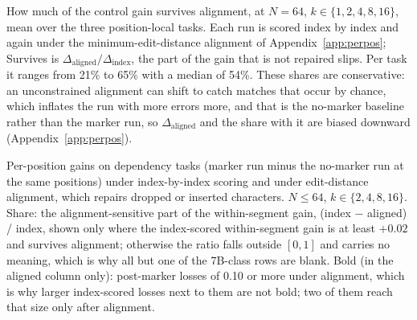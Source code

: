 \documentclass[10pt]{article} %
\begin{document}
\begin{table}[!htbp]
\centering
\small
\caption{How much of the control gain survives alignment, at $N = 64$, $k \in \{1, 2, 4, 8, 16\}$, mean over the three position-local tasks. Each run is scored index by index and again under the minimum-edit-distance alignment of Appendix~\ref{app:perpos}; Survives is $\Delta_{\text{aligned}} / \Delta_{\text{index}}$, the part of the gain that is not repaired slips. Per task it ranges from 21\% to 65\% with a median of 54\%. These shares are conservative: an unconstrained alignment can shift to catch matches that occur by chance, which inflates the run with more errors more, and that is the no-marker baseline rather than the marker run, so $\Delta_{\text{aligned}}$ and the share with it are biased downward (Appendix~\ref{app:perpos}).}
\label{tab:alignedctl}

\end{table}

\begin{table}[!htbp]
\centering
\small
\caption{Per-position gains on dependency tasks (marker run minus the no-marker run at the same positions) under index-by-index scoring and under edit-distance alignment, which repairs dropped or inserted characters. $N \le 64$, $k \in \{2,4,8,16\}$. Share: the alignment-sensitive part of the within-segment gain, (index $-$ aligned) / index, shown only where the index-scored within-segment gain is at least $+0.02$ and survives alignment; otherwise the ratio falls outside $[0, 1]$ and carries no meaning, which is why all but one of the 7B-class rows are blank. Bold (in the aligned column only): post-marker losses of 0.10 or more under alignment, which is why larger index-scored losses next to them are not bold; two of them reach that size only after alignment.}
\label{tab:aligned}
\resizebox{0.85\linewidth}{!}{}
\end{table}
\end{document}
